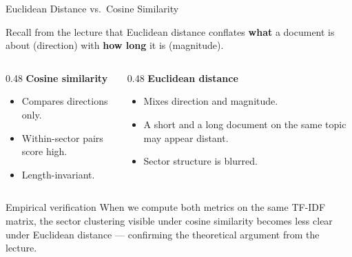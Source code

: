 \documentclass[aspectratio=169,11pt]{beamer}
\begin{document}
\begin{frame}{Euclidean Distance vs.\ Cosine Similarity}

Recall from the lecture that Euclidean distance conflates
\textbf{what} a document is about (direction) with
\textbf{how long} it is (magnitude).

\vspace{8pt}
\begin{columns}[T]
\begin{column}{0.48\textwidth}
\textbf{Cosine similarity}
\begin{itemize}
  \item Compares directions only.
  \item Within-sector pairs score high.
  \item Length-invariant.
\end{itemize}
\end{column}
\begin{column}{0.48\textwidth}
\textbf{Euclidean distance}
\begin{itemize}
  \item Mixes direction and magnitude.
  \item A short and a long document on the
        same topic may appear distant.
  \item Sector structure is blurred.
\end{itemize}
\end{column}
\end{columns}

\vspace{8pt}
\begin{alertblock}{Empirical verification}
When we compute both metrics on the same TF-IDF matrix, the
sector clustering visible under cosine similarity becomes
less clear under Euclidean distance ---
confirming the theoretical argument from the lecture.
\end{alertblock}

\end{frame}
\end{document}
